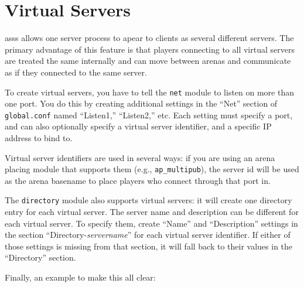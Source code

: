 \documentclass{article}
\newcommand{\asss}{asss}
\begin{document}
%
%



\section{Virtual Servers}

\asss{} allows one server process to apear to clients as several
different servers. The primary advantage of this feature is that players
connecting to all virtual servers are treated the same internally and
can move between arenas and communicate as if they connected to the same
server.

To create virtual servers, you have to tell the \verb/net/ module to
listen on more than one port. You do this by creating additional
settings in the ``Net'' section of \verb/global.conf/ named ``Listen1,''
``Listen2,'' etc. Each setting must specify a port, and can also
optionally specify a virtual server identifier, and a specific IP
address to bind to.

Virtual server identifiers are used in several ways: if you are using an
arena placing module that supports them (e.g., \verb/ap_multipub/), the
server id will be used as the arena basename to place players who
connect through that port in.

The \verb/directory/ module also supports virtual servers: it will
create one directory entry for each virtual server. The server name and
description can be different for each virtual server. To specify them,
create ``Name'' and ``Description'' settings in the section
``Directory-\emph{servername}'' for each virtual server identifier. If
either of those settings is missing from that section, it will fall back
to their values in the ``Directory'' section.

Finally, an example to make this all clear:
\end{document}
